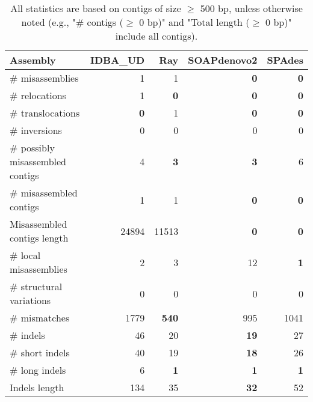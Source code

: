\documentclass[12pt,a4paper]{article}
\begin{document}
\begin{table}[ht]
\begin{center}
\caption{All statistics are based on contigs of size $\geq$ 500 bp, unless otherwise noted (e.g., "\# contigs ($\geq$ 0 bp)" and "Total length ($\geq$ 0 bp)" include all contigs).}
\begin{tabular}{|l*{4}{|r}|}
\hline
Assembly & IDBA\_UD & Ray & SOAPdenovo2 & SPAdes \\ \hline
\# misassemblies & 1 & 1 & {\bf 0} & {\bf 0} \\ \hline
\hspace{5mm}\# relocations & 1 & {\bf 0} & {\bf 0} & {\bf 0} \\ \hline
\hspace{5mm}\# translocations & {\bf 0} & 1 & {\bf 0} & {\bf 0} \\ \hline
\hspace{5mm}\# inversions & 0 & 0 & 0 & 0 \\ \hline
\# possibly misassembled contigs & 4 & {\bf 3} & {\bf 3} & 6 \\ \hline
\# misassembled contigs & 1 & 1 & {\bf 0} & {\bf 0} \\ \hline
Misassembled contigs length & 24894 & 11513 & {\bf 0} & {\bf 0} \\ \hline
\# local misassemblies & 2 & 3 & 12 & {\bf 1} \\ \hline
\# structural variations & 0 & 0 & 0 & 0 \\ \hline
\# mismatches & 1779 & {\bf 540} & 995 & 1041 \\ \hline
\# indels & 46 & 20 & {\bf 19} & 27 \\ \hline
\hspace{5mm}\# short indels & 40 & 19 & {\bf 18} & 26 \\ \hline
\hspace{5mm}\# long indels & 6 & {\bf 1} & {\bf 1} & {\bf 1} \\ \hline
Indels length & 134 & 35 & {\bf 32} & 52 \\ \hline
\end{tabular}
\end{center}
\end{table}
\end{document}

